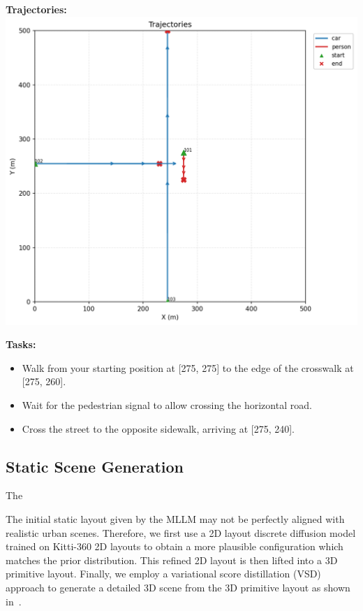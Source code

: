 \documentclass{article}
\begin{document}
\begin{tcolorbox}[examplebox, title=Scene Specification Format]
\label{fig:gemini_static_example}

\vspace{1em}

\textbf{Trajectories:}
\includegraphics[width=0.8\linewidth]{images/gemini_dynamic_example.png}


\label{fig:gemini_dynamic_example}


\textbf{Tasks:}
\begin{itemize}[leftmargin=1.2em]
    \item Walk from your starting position at [275, 275] to the edge of the crosswalk at [275, 260].
    \item Wait for the pedestrian signal to allow crossing the horizontal road.
    \item Cross the street to the opposite sidewalk, arriving at [275, 240].
\end{itemize}


\end{tcolorbox}

\subsection{Static Scene Generation}

The

The initial static layout given by the MLLM may not be perfectly aligned with realistic urban scenes. Therefore, we first use a 2D layout discrete diffusion model trained on Kitti-360 2D layouts to obtain a more plausible configuration which matches the prior distribution. This refined 2D layout is then lifted into a 3D primitive layout. Finally, we employ a variational score distillation (VSD) approach to generate a detailed 3D scene from the 3D primitive layout as shown in~\cite{lu2024urban}.
\end{document}
